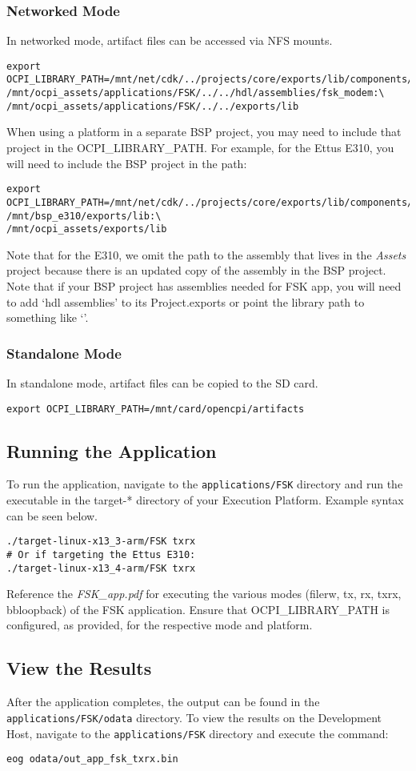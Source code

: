 \begin{flushleft}
\subsubsection{Networked Mode}
In networked mode, artifact files can be accessed via NFS mounts.
\begin{verbatim}
export OCPI_LIBRARY_PATH=/mnt/net/cdk/../projects/core/exports/lib/components/rcc:\
/mnt/ocpi_assets/applications/FSK/../../hdl/assemblies/fsk_modem:\
/mnt/ocpi_assets/applications/FSK/../../exports/lib
\end{verbatim}
When using a platform in a separate BSP project, you may need to include that project in the OCPI\_LIBRARY\_PATH. For example, for the Ettus E310, you will need to include the BSP project in the path:
\begin{verbatim}
export OCPI_LIBRARY_PATH=/mnt/net/cdk/../projects/core/exports/lib/components/rcc:\
/mnt/bsp_e310/exports/lib:\
/mnt/ocpi_assets/exports/lib
\end{verbatim}
Note that for the E310, we omit the path to the \code{fsk\_modem} assembly that lives in the \textit{Assets} project because there is an updated copy of the assembly in the BSP project. Note that if your BSP project has assemblies needed for FSK app, you will need to add `hdl assemblies' to its Project.exports or point the library path to something like `'.
\subsubsection{Standalone Mode}
In standalone mode, artifact files can be copied to the SD card.
\begin{verbatim}
export OCPI_LIBRARY_PATH=/mnt/card/opencpi/artifacts
\end{verbatim}
\subsection{Running the Application}
To run the application, navigate to the \texttt{applications/FSK} directory and run the executable in the target-* directory of your Execution Platform. Example syntax can be seen below.
\begin{verbatim}
./target-linux-x13_3-arm/FSK txrx
# Or if targeting the Ettus E310:
./target-linux-x13_4-arm/FSK txrx
\end{verbatim}
Reference the \textit{FSK\_app.pdf} for executing the various modes (filerw, tx, rx, txrx, bbloopback) of the FSK application. Ensure that OCPI\_LIBRARY\_PATH is configured, as provided, for the respective mode and platform.
\subsection{View the Results}
After the application completes, the output can be found in the \texttt{applications/FSK/odata} directory. To view the results on the Development Host, navigate to the \texttt{applications/FSK} directory and execute the command:
\begin{verbatim}
eog odata/out_app_fsk_txrx.bin
\end{verbatim}
\end{flushleft}

